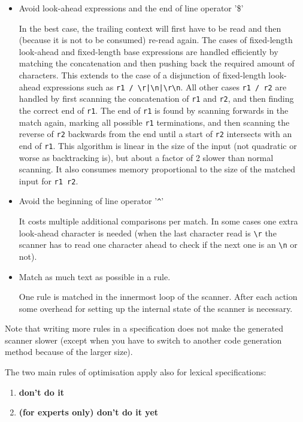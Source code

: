 \documentclass[11pt]{scrartcl}
\begin{document}
\begin{itemize}
\item
  Avoid look-ahead expressions and the end of line operator '\$'

  In the best case, the trailing context will first have to be read and 
  then (because it is not to be consumed) re-read again. The cases of 
  fixed-length look-ahead and fixed-length base expressions are handled efficiently
  by matching the concatenation and then pushing back the required amount
  of characters. This extends to the case of a disjunction of fixed-length
  look-ahead expressions such as \verb+r1 / \r|\n|\r\n+. All other cases
  \verb+r1 / r2+ are handled by first scanning the concatenation of 
  \verb+r1+ and \verb+r2+, and then finding the correct end of \verb+r1+. 
  The end of \verb+r1+ is found by scanning forwards in the match again,
  marking all possible \verb+r1+ terminations, and then scanning the reverse
  of \verb+r2+ backwards from the end until a start of \verb+r2+ intersects
  with an end of \verb+r1+. This algorithm is linear in the size of the input
  (not quadratic or worse as backtracking is), but about a factor of 2 slower 
  than normal scanning. It also consumes memory proportional to the size
  of the matched input for \verb+r1 r2+. 

\item
  Avoid the beginning of line operator '\verb+^+'
  
  It costs multiple additional comparisons per match. In some
  cases one extra look-ahead character is needed (when the last character read is
  \verb+\r+ the scanner has to read one character ahead to check if
  the next one is an \verb+\n+ or not).

\item
  Match as much text as possible in a rule.
  
  One rule is matched in the innermost loop of the scanner.  After
  each action some overhead for setting up the internal state of the
   scanner is necessary.
\end{itemize}

Note that writing more rules in a specification does not make the generated
scanner slower (except when you have to switch to another code generation
method because of the larger size).

The two main rules of optimisation apply also for lexical specifications:
\begin{enumerate}
\item {\bf don't do it}
\item {\bf (for experts only) don't do it yet}
\end{enumerate}
\end{document}
